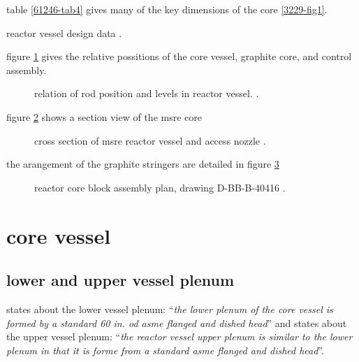 \documentclass{article}
\newcommand*{\mrsarchive}{../../msr-archive}%
\begin{document}
table \ref{61246-tab4} gives many of the key dimensions of the core \ref{3229-fig1}.
\begin{table}[H]
  \centering
  \caption{reactor vessel design data \parencite[table 4]{ad-cf-61-2-46}.}
  \label{61246-tab4}
\end{table}

figure \ref{4233-fig2} gives the relative possitions of the core vessel, graphite core, and control assembly.
\begin{figure}[H]
  \centering
  \caption{relation of rod position and levels in reactor vessel. \parencite[table 4]{ornl-4233}.}
  \label{4233-fig2}
\end{figure}

figure \ref{0728-p109-p110} shows a section view of the msre core
\begin{figure}[H]
  \centering
  \caption{cross section of msre reactor vessel and access nozzle \parencite[page 109-110]{ornl-tm-0728}.}
  \label{0728-p109-p110}
\end{figure}

the arangement of the graphite stringers are detailed in figure \ref{4174-p10-p11}
\begin{figure}[H]
  \centering
  \caption{reactor core block assembly plan, drawing D-BB-B-40416 \parencite[page 13]{ornl-tm-4174}.}
  \label{4174-p10-p11}
\end{figure}

\section{core vessel}
\subsection{lower and upper vessel plenum}
\textcite[page 14]{ornl-tm-3229} states about the lower vessel plenum:
\enquote{\textit{the lower plenum of the core vessel is formed by a standard 60 in. od asme flanged and dished head}} and \textcite[page 25]{ornl-tm-3229} states about the upper vessel plenum:
\enquote{\textit{the reactor vessel upper plenum is similar to the lower plenum in that it is forme from a standard asme flanged and dished head}}.
\end{document}
